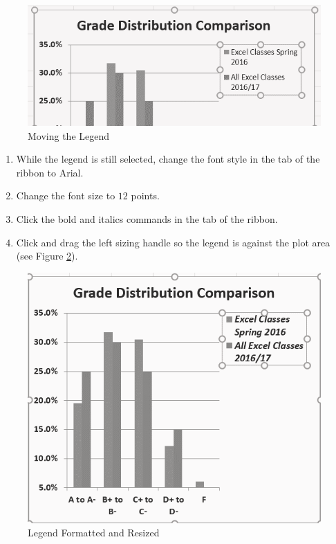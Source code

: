 \begin{figure}[H]
	\centering
	\includegraphics[width=\maxwidth{.95\linewidth}]{gfx/ch04_fig30}
	\caption{Moving the Legend}
	\label{04:fig30}
\end{figure}

\begin{enumerate}
	\item While the legend is still selected, change the font style in the  tab of the ribbon to Arial.
	\item Change the font size to $ 12 $ points.
	\item Click the bold and italics commands in the  tab of the ribbon.
	\item Click and drag the left sizing handle so the legend is against the plot area (see Figure \ref{04:fig31}).
\end{enumerate}

\begin{figure}[H]
	\centering
	\includegraphics[width=\maxwidth{.95\linewidth}]{gfx/ch04_fig31}
	\caption{Legend Formatted and Resized}
	\label{04:fig31}
\end{figure}

